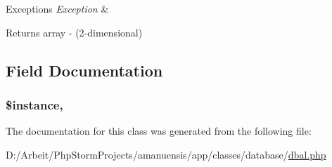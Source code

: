 \begin{DoxyExceptions}{Exceptions}
{\em Exception} & \\
\hline
\end{DoxyExceptions}
\begin{DoxyReturn}{Returns}
array -\/ (2-\/dimensional) 
\end{DoxyReturn}


\subsection{Field Documentation}
\hypertarget{class_d_b_a_l_ad9d7ce33ebb142b70e58b68052ca0ea8}{}
\subsubsection[{\$instance}]{\setlength{\rightskip}{0pt plus 5cm}\$instance\hspace{0.3cm}{\ttfamily [static]}, {\ttfamily [protected]}}\label{class_d_b_a_l_ad9d7ce33ebb142b70e58b68052ca0ea8}


The documentation for this class was generated from the following file\+:\begin{DoxyCompactItemize}
\item 
D\+:/\+Arbeit/\+Php\+Storm\+Projects/amanuensis/app/classes/database/\hyperlink{dbal_8php}{dbal.\+php}\end{DoxyCompactItemize}
